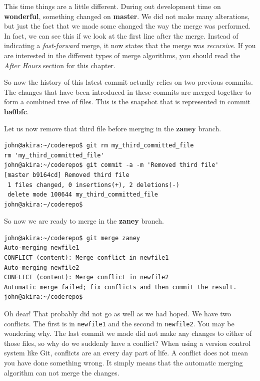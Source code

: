 This time things are a little different.  During out development time on \textbf{wonderful}, something changed on \textbf{master}.  We did not make many alterations, but just the fact that we made some changed the way the merge was performed.  In fact, we can see this if we look at the first line after the merge.  Instead of indicating a \emph{fast-forward} merge, it now states that the merge was \emph{recursive}.  If you are interested in the different types of merge algorithms, you should read the \emph{After Hours} section for this chapter.

So now the history of this latest commit actually relies on two previous commits.  The changes that have been introduced in these commits are merged together to form a combined tree of files.  This is the snapshot that is represented in commit \textbf{ba0bfc}.

Let us now remove that third file before merging in the \textbf{zaney} branch.

\begin{Verbatim}[frame=leftline,framerule=1mm,fontsize=\relsize{-3}] 
john@akira:~/coderepo$ git rm my_third_committed_file
rm 'my_third_committed_file'
john@akira:~/coderepo$ git commit -a -m 'Removed third file'
[master b9164cd] Removed third file
 1 files changed, 0 insertions(+), 2 deletions(-)
 delete mode 100644 my_third_committed_file
john@akira:~/coderepo$ 
\end{Verbatim}

So now we are ready to merge in the \textbf{zaney} branch.

\begin{Verbatim}[frame=leftline,framerule=1mm,fontsize=\relsize{-3}] 
john@akira:~/coderepo$ git merge zaney
Auto-merging newfile1
CONFLICT (content): Merge conflict in newfile1
Auto-merging newfile2
CONFLICT (content): Merge conflict in newfile2
Automatic merge failed; fix conflicts and then commit the result.
john@akira:~/coderepo$ 
\end{Verbatim}

Oh dear!  That probably did not go as well as we had hoped.  We have two conflicts.  The first is in \texttt{newfile1} and the second in \texttt{newfile2}.  You may be wondering why.  The last commit we made did not make any changes to either of those files, so why do we suddenly have a conflict?  When using a version control system like Git, conflicts are an every day part of life.  A conflict does not mean you have done something wrong.  It simply means that the automatic merging algorithm can not merge the changes.

